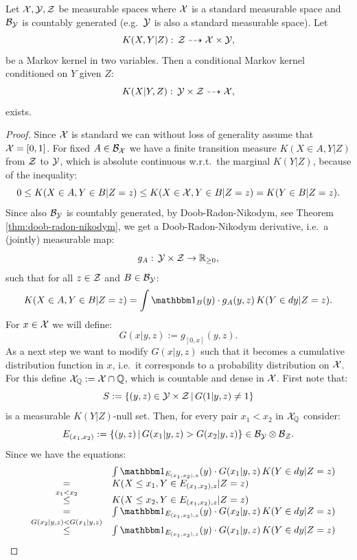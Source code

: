 \begin{Thm}
    \label{reg-cond-trans-kernel-existence-I}
    Let $\mathcal{X}, \mathcal{Y}, \mathcal{Z}$ be measurable spaces where $\mathcal{X}$ is a standard measurable space and $\mathcal{B}_{\mathcal{Y}}$ is countably generated (e.g.\ $\mathcal{Y}$ is also a standard measurable space).
Let 
\[ K(X,Y|Z): \, \mathcal{Z} \dashrightarrow  \mathcal{X} \times \mathcal{Y},\]
be a Markov kernel in two variables. 
Then a conditional Markov kernel
conditioned on $Y$ given $Z$:
\[ K(X|Y,Z): \, \mathcal{Y} \times \mathcal{Z} \dashrightarrow  \mathcal{X},\]
exists.
\begin{proof}
    Since $\mathcal{X}$ is standard we can without loss of generality assume that $\mathcal{X}=[0,1]$.
    For fixed $A \in \mathcal{B}_{\mathcal{X}}$
    we have a finite transition measure $ K(X\in A, Y|Z)$ from $\mathcal{Z}$ to $\mathcal{Y}$, which is 
    absolute continuous w.r.t.\ the marginal $ K(Y|Z)$, because of the inequality:
    \[ 0 \le  K(X\in A, Y \in B |Z=z) \le K(X\in \mathcal{X}, Y \in B |Z=z) = K(Y \in B |Z=z).   \]
    Since also $\mathcal{B}_{\mathcal{Y}}$ is countably generated, by Doob-Radon-Nikodym, see Theorem \ref{thm:doob-radon-nikodym},
    we get a Doob-Radon-Nikodym derivative, i.e.\ a (jointly) measurable map:
    \[g_A:\, \mathcal{Y} \times \mathcal{Z} \to \mathbb{R}_{\ge 0},\]
    such that for all $z \in \mathcal{Z}$ and $B \in \mathcal{B}_{\mathcal{Y}}$:
    \[  K(X \in A, Y \in B|Z=z) = \int \I_B(y) \cdot g_A(y,z)\,  K(Y \in dy|Z=z).\]
    For $x \in \mathcal{X}$ we will define:
    \[ G(x|y,z) := g_{[0,x]}(y,z).\] 
As a next step we want to modify  $G(x|y,z)$ such that it becomes a cumulative distribution function in $x$, i.e.\ it corresponds to a probability distribution on $\mathcal{X}$. 
For this define $\mathcal{X}_{\mathbb{Q}}:= \mathcal{X} \cap \mathbb{Q}$, which is countable and dense in $\mathcal{X}$.
First note that:
\[ S:=\left \{ (y,z) \in \mathcal{Y} \times \mathcal{Z} \,|\, G(1|y,z) \neq 1 \right \}  \]
is a measurable $ K(Y|Z)$-null set.
Then, for every pair $x_1<x_2$ in $\mathcal{X}_{\mathbb{Q}}$ consider:
\[ E_{(x_1,x_2)} := \{ (y,z) \,|\, G(x_1|y,z) > G(x_2|y,z) \} \in \mathcal{B}_{\mathcal{Y}} \otimes \mathcal{B}_{\mathcal{Z}}. \]
Since we have the equations:
\[ \begin{array}{rcl}
 &&\int \I_{E_{(x_1,x_2),z}}(y) \cdot G(x_1|y,z) \,  K(Y \in dy|Z=z) \\
&=&  K(X \le x_1, Y \in E_{(x_1,x_2),z} |Z=z) \\
&\stackrel{x_1 < x_2}{\le}&  K(X \le x_2, Y \in E_{(x_1,x_2),z} |Z=z)  \\
&=& \int \I_{E_{(x_1,x_2),z}}(y) \cdot G(x_2|y,z) \,  K(Y \in dy|Z=z) \\
&\stackrel{G(x_2|y,z) < G(x_1|y,z)}{\le} & \int \I_{E_{(x_1,x_2),z}}(y) \cdot G(x_1|y,z) \,  K(Y \in dy|Z=z)

\end{array}\]
\end{proof}
\end{Thm}

